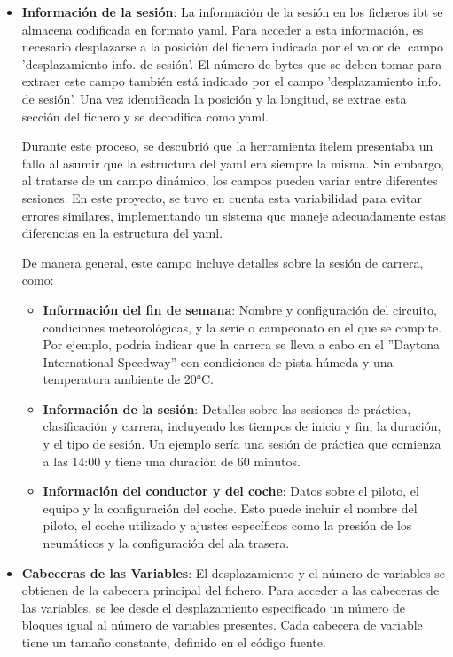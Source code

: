 \begin{itemize}
    \item \textbf{Información de la sesión}: La información de la sesión en los ficheros \ac{ibt} se almacena codificada en formato \ac{yaml}. Para acceder a esta información, es necesario desplazarse a la posición del fichero indicada por el valor del campo 'desplazamiento info. de sesión'. El número de bytes que se deben tomar para extraer este campo también está indicado por el campo 'desplazamiento info. de sesión'. Una vez identificada la posición y la longitud, se extrae esta sección del fichero y se decodifica como \ac{yaml}.
    
    Durante este proceso, se descubrió que la herramienta itelem presentaba un fallo al asumir que la estructura del \ac{yaml} era siempre la misma. Sin embargo, al tratarse de un campo dinámico, los campos pueden variar entre diferentes sesiones. En este proyecto, se tuvo en cuenta esta variabilidad para evitar errores similares, implementando un sistema que maneje adecuadamente estas diferencias en la estructura del \ac{yaml}.

    De manera general, este campo incluye detalles sobre la sesión de carrera, como:
    \begin{itemize}
        \item \textbf{Información del fin de semana}: Nombre y configuración del circuito, condiciones meteorológicas, y la serie o campeonato en el que se compite. Por ejemplo, podría indicar que la carrera se lleva a cabo en el ''Daytona International Speedway'' con condiciones de pista húmeda y una temperatura ambiente de 20°C.
        \item \textbf{Información de la sesión}: Detalles sobre las sesiones de práctica, clasificación y carrera, incluyendo los tiempos de inicio y fin, la duración, y el tipo de sesión. Un ejemplo sería una sesión de práctica que comienza a las 14:00 y tiene una duración de 60 minutos.
        \item \textbf{Información del conductor y del coche}: Datos sobre el piloto, el equipo y la configuración del coche. Esto puede incluir el nombre del piloto, el coche utilizado y ajustes específicos como la presión de los neumáticos y la configuración del ala trasera.
    \end{itemize}
    \item \textbf{Cabeceras de las Variables}: El desplazamiento y el número de variables se obtienen de la cabecera principal del fichero. Para acceder a las cabeceras de las variables, se lee desde el desplazamiento especificado un número de bloques igual al número de variables presentes. Cada cabecera de variable tiene un tamaño constante, definido en el código fuente.


\end{itemize}
